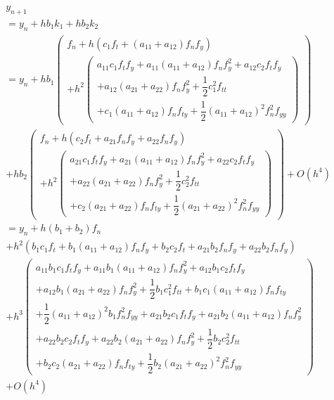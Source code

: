 \documentclass[a4paper,oneside]{book}
\numberwithin{equation}{chapter}
\begin{document}
\begin{align}
&{{y_{n + 1}}} \\
&= {{y_n}} + h{b_1}{k_1} + h{b_2}{k_2}\\
& = {{y_n}} + h{b_1}\left( \begin{array}{l}
{f_n} + h\left( {{c_1}{f_t} + \left( {{a_{11}} + {a_{12}}} \right){f_n}{f_y}} \right)\\
 + {h^2}\left( \begin{array}{l}
{a_{11}}{c_1}{f_t}{f_y} + {a_{11}}\left( {{a_{11}} + {a_{12}}} \right){f_n}f_y^2 + {a_{12}}{c_2}{f_t}{f_y}\\
 + {a_{12}}\left( {{a_{21}} + {a_{22}}} \right){f_n}f_y^2 + \dfrac{1}{2}c_1^2{f_{tt}}\\
 + {c_1}\left( {{a_{11}} + {a_{12}}} \right){f_n}{f_{ty}} + \dfrac{1}{2}{\left( {{a_{11}} + {a_{12}}} \right)^2}f_n^2{f_{yy}}
\end{array} \right)
\end{array} \right)\\
 &+ h{b_2}\left( \begin{array}{l}
{f_n} + h\left( {{c_2}{f_t} + {a_{21}}{f_n}{f_y} + {a_{22}}{f_n}{f_y}} \right)\\
 + {h^2}\left( \begin{array}{l}
{a_{21}}{c_1}{f_t}{f_y} + {a_{21}}\left( {{a_{11}} + {a_{12}}} \right){f_n}f_y^2 + {a_{22}}{c_2}{f_t}{f_y}\\
 + {a_{22}}\left( {{a_{21}} + {a_{22}}} \right){f_n}f_y^2 + \dfrac{1}{2}c_2^2{f_{tt}}\\
 + {c_2}\left( {{a_{21}} + {a_{22}}} \right){f_n}{f_{ty}} + \dfrac{1}{2}{\left( {{a_{21}} + {a_{22}}} \right)^2}f_n^2{f_{yy}}
\end{array} \right)
\end{array} \right) + O\left( {{h^4}} \right)\\
& = {{y_n}} + h\left( {{b_1} + {b_2}} \right){f_n} \label{7.23}\\
 &+ {h^2}\left( {{b_1}{c_1}{f_t} + {b_1}\left( {{a_{11}} + {a_{12}}} \right){f_n}{f_y} + {b_2}{c_2}{f_t} + {a_{21}}{b_2}{f_n}{f_y} + {a_{22}}{b_2}{f_n}{f_y}} \right)\\
& + {h^3}\left( \begin{array}{l}
{a_{11}}{b_1}{c_1}{f_t}{f_y} + {a_{11}}{b_1}\left( {{a_{11}} + {a_{12}}} \right){f_n}f_y^2 + {a_{12}}{b_1}{c_2}{f_t}{f_y}\\
 + {a_{12}}{b_1}\left( {{a_{21}} + {a_{22}}} \right){f_n}f_y^2 + \dfrac{1}{2}{b_1}c_1^2{f_{tt}} + {b_1}{c_1}\left( {{a_{11}} + {a_{12}}} \right){f_n}{f_{ty}}\\
 + \dfrac{1}{2}{\left( {{a_{11}} + {a_{12}}} \right)^2}{b_1}f_n^2{f_{yy}} + {a_{21}}{b_2}{c_1}{f_t}{f_y} + {a_{21}}{b_2}\left( {{a_{11}} + {a_{12}}} \right){f_n}f_y^2\\
 + {a_{22}}{b_2}{c_2}{f_t}{f_y} + {a_{22}}{b_2}\left( {{a_{21}} + {a_{22}}} \right){f_n}f_y^2 + \dfrac{1}{2}{b_2}c_2^2{f_{tt}}\\
 + {b_2}{c_2}\left( {{a_{21}} + {a_{22}}} \right){f_n}{f_{ty}} + \dfrac{1}{2}{b_2}{\left( {{a_{21}} + {a_{22}}} \right)^2}f_n^2{f_{yy}}
\end{array} \right)\\
& + O\left( {{h^4}} \right) \label{7.26}
\end{align}
\end{document}
